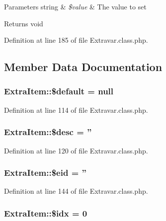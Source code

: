 \begin{DoxyParams}[1]{Parameters}
string & {\em \$value} & The value to set \\
\hline
\end{DoxyParams}
\begin{DoxyReturn}{Returns}
void 
\end{DoxyReturn}


Definition at line 185 of file Extravar.\+class.\+php.



\subsection{Member Data Documentation}
\hypertarget{classExtraItem_a8499b54a8ec7aa3e3a40201d1458ffe5}{
\subsubsection[{\$default}]{\setlength{\rightskip}{0pt plus 5cm}Extra\+Item\+::\$default = null}}\label{classExtraItem_a8499b54a8ec7aa3e3a40201d1458ffe5}


Definition at line 114 of file Extravar.\+class.\+php.

\hypertarget{classExtraItem_a47059cf3ac48f0d31c5358fa5e97f106}{
\subsubsection[{\$desc}]{\setlength{\rightskip}{0pt plus 5cm}Extra\+Item\+::\$desc = ''}}\label{classExtraItem_a47059cf3ac48f0d31c5358fa5e97f106}


Definition at line 120 of file Extravar.\+class.\+php.

\hypertarget{classExtraItem_a8a68f26bb602679ebf4095e774425092}{
\subsubsection[{\$eid}]{\setlength{\rightskip}{0pt plus 5cm}Extra\+Item\+::\$eid = ''}}\label{classExtraItem_a8a68f26bb602679ebf4095e774425092}


Definition at line 144 of file Extravar.\+class.\+php.

\hypertarget{classExtraItem_aadcda4aa903481b261d86bc50ab1c238}{
\subsubsection[{\$idx}]{\setlength{\rightskip}{0pt plus 5cm}Extra\+Item\+::\$idx = 0}}\label{classExtraItem_aadcda4aa903481b261d86bc50ab1c238}


